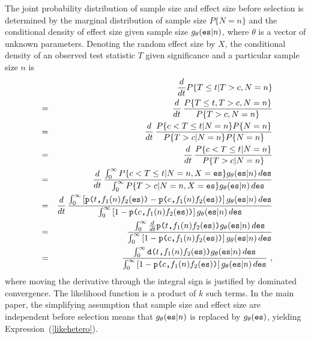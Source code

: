\documentclass[jou]{apa6} %
\newcommand{\R}[1]{\mbox{\texttt{#1}}} %
\begin{document}
The joint probability distribution of sample size and effect size before selection is determined by the marginal distribution of sample size $P\{N=n\}$ and the conditional density of effect size given sample size $g_\theta(\R{es}|n)$, where $\theta$ is a vector of unknown parameters. 
Denoting the random effect size by $X$, the conditional density of an observed test statistic $T$ given significance and a particular sample size $n$ is
{\small
\begin{eqnarray*}
    &&    \frac{d}{dt} P\{T\leq t| T >c, N=n \} \\
    & = & \frac{d}{dt} \, \frac{P\{T \leq t, T> c, N=n \}}
                                  {P\{T>c, N=n\}}  \\
    & = & \frac{d}{dt} \, \frac{P\{c< T \leq t| N=n \} P\{N=n\}}         
                               {P\{T>c| N=n\} P\{N=n\}} \\
    & = & \frac{d}{dt} \, \frac{P\{c< T \leq t| N=n \}}         
                               {P\{T>c| N=n\}} \\     %
    & = & \frac{d}{dt} \, 
          \frac{\int_0^\infty P\{c< T \leq t| N=n,X=\R{es}\} g_\theta(\R{es}|n) \, d\R{es}}
               {\int_0^\infty P\{T>c| N=n,X=\R{es}\}  g_\theta(\R{es}|n) \, d\R{es}} \\  
    & = & \frac{d}{dt} \, 
          \frac{\int_0^\infty \left[\R{p(}t\R{,}f_1(n)f_2(\R{es})\R{)} -
                \R{p(}c\R{,}f_1(n)f_2(\R{es})\R{)} \right] g_\theta(\R{es}|n) \, d\R{es} }
               {\int_0^\infty \left[1-\R{p(}c\R{,}f_1(n)f_2(\R{es})\R{)}\right] 
                g_\theta(\R{es}|n) \, d\R{es} } \\
    & = & \frac{\int_0^\infty \frac{d}{dt} \R{p(}t\R{,}f_1(n)f_2(\R{es})\R{)}
                g_\theta(\R{es}|n) \, d\R{es}} 
               {\int_0^\infty\left[1-\R{p(}c\R{,}f_1(n)f_2(\R{es})\R{)}\right]
                g_\theta(\R{es}|n) \, d\R{es}} \\
    & = & \frac{\int_0^\infty\R{d(}t\R{,}f_1(n)f_2(\R{es})\R{)} 
                g_\theta(\R{es}|n) \, d\R{es}} 
               {\int_0^\infty\left[1-\R{p(}c\R{,}f_1(n)f_2(\R{es})\R{)}\right]
                g_\theta(\R{es}|n) \, d\R{es}} ~,
\end{eqnarray*} 
} %
where moving the derivative through the integral sign is justified by dominated convergence. The likelihood function is a product of $k$ such terms. In the main paper, the simplifying assumption that sample size and effect size are independent before selection means that $g_\theta(\R{es}|n)$ is replaced by $g_\theta(\R{es})$, yielding Expression~(\ref{likehetero}). 
\end{document}
